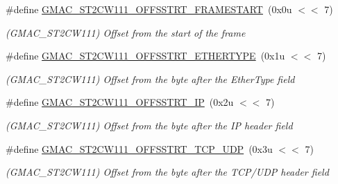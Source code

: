 \begin{DoxyCompactItemize}
\item 
\mbox{\label{group__SAME70__GMAC_ga20dae1cf88af1d373d73faa5687f2352}} 
\#define \mbox{\hyperlink{group__SAME70__GMAC_ga20dae1cf88af1d373d73faa5687f2352}{G\+M\+A\+C\+\_\+\+S\+T2\+C\+W111\+\_\+\+O\+F\+F\+S\+S\+T\+R\+T\+\_\+\+F\+R\+A\+M\+E\+S\+T\+A\+RT}}~(0x0u $<$$<$ 7)
\begin{DoxyCompactList}\small\item\em (G\+M\+A\+C\+\_\+\+S\+T2\+C\+W111) Offset from the start of the frame \end{DoxyCompactList}\item 
\mbox{\label{group__SAME70__GMAC_ga4c2a089c4508920190c52a422df1fbe2}} 
\#define \mbox{\hyperlink{group__SAME70__GMAC_ga4c2a089c4508920190c52a422df1fbe2}{G\+M\+A\+C\+\_\+\+S\+T2\+C\+W111\+\_\+\+O\+F\+F\+S\+S\+T\+R\+T\+\_\+\+E\+T\+H\+E\+R\+T\+Y\+PE}}~(0x1u $<$$<$ 7)
\begin{DoxyCompactList}\small\item\em (G\+M\+A\+C\+\_\+\+S\+T2\+C\+W111) Offset from the byte after the Ether\+Type field \end{DoxyCompactList}\item 
\mbox{\label{group__SAME70__GMAC_ga8140277da037ab04dcfb9fc80ad90688}} 
\#define \mbox{\hyperlink{group__SAME70__GMAC_ga8140277da037ab04dcfb9fc80ad90688}{G\+M\+A\+C\+\_\+\+S\+T2\+C\+W111\+\_\+\+O\+F\+F\+S\+S\+T\+R\+T\+\_\+\+IP}}~(0x2u $<$$<$ 7)
\begin{DoxyCompactList}\small\item\em (G\+M\+A\+C\+\_\+\+S\+T2\+C\+W111) Offset from the byte after the IP header field \end{DoxyCompactList}\item 
\mbox{\label{group__SAME70__GMAC_gac168aa5aa65d6bbe4bb8ae1653b996aa}} 
\#define \mbox{\hyperlink{group__SAME70__GMAC_gac168aa5aa65d6bbe4bb8ae1653b996aa}{G\+M\+A\+C\+\_\+\+S\+T2\+C\+W111\+\_\+\+O\+F\+F\+S\+S\+T\+R\+T\+\_\+\+T\+C\+P\+\_\+\+U\+DP}}~(0x3u $<$$<$ 7)
\begin{DoxyCompactList}\small\item\em (G\+M\+A\+C\+\_\+\+S\+T2\+C\+W111) Offset from the byte after the T\+C\+P/\+U\+DP header field \end{DoxyCompactList}\item 
\mbox{\label{group__SAME70__GMAC_ga264c2920d8e45dcfeff24e457aa964fe}} 

\end{DoxyCompactItemize}
